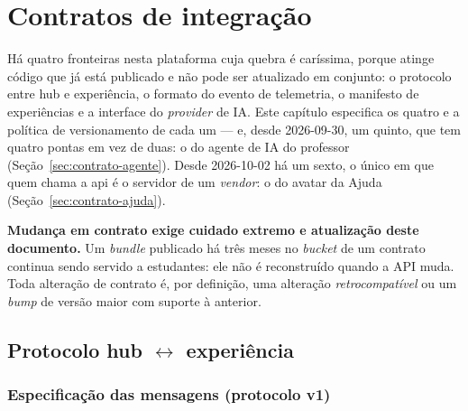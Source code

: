 \chapter{Contratos de integração}
\label{cap:contratos}

Há quatro fronteiras nesta plataforma cuja quebra é caríssima, porque atinge
código que já está publicado e não pode ser atualizado em conjunto: o protocolo
 entre hub e experiência, o formato do evento de telemetria, o
manifesto de experiências e a interface do \emph{provider} de IA. Este capítulo
especifica os quatro e a política de versionamento de cada um --- e, desde
2026-09-30, um quinto, que tem quatro pontas em vez de duas: o do agente de IA do
professor (Seção~\ref{sec:contrato-agente}). Desde 2026-10-02 há um sexto, o
único em que quem chama a api é o servidor de um \emph{vendor}: o do avatar da
Ajuda (Seção~\ref{sec:contrato-ajuda}).

\begin{regra}
\textbf{Mudança em contrato exige cuidado extremo e atualização deste
documento.} Um \emph{bundle} publicado há três meses no \emph{bucket} de um
contrato continua sendo servido a estudantes: ele não é reconstruído quando a API
muda. Toda alteração de contrato é, por definição, uma alteração
\emph{retrocompatível} ou um \emph{bump} de versão maior com suporte à anterior.
\end{regra}

\section{Protocolo  hub $\leftrightarrow$ experiência}
\label{sec:bridge}

\subsection{Especificação das mensagens (protocolo v1)}

